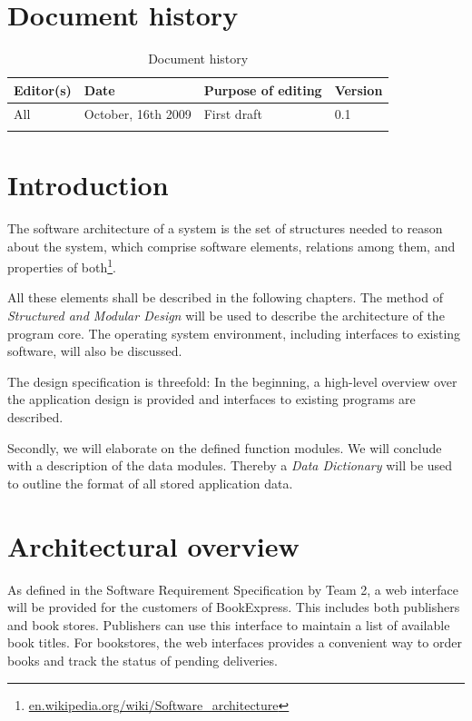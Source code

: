 


\maketitle
\newpage
\tableofcontents
\newpage
\listoftables
\newpage

\setcounter{page}{4}

\section{Document history}
\begin{longtable}[c]{|p{}|p{}|p{}|p{}|}
\hline
Editor(s) & Date & Purpose of editing & Version\\
\hline
\hline
All & October, 16th 2009 & First draft & 0.1 \\
\hline
\caption{Document history}
\end{longtable}
\newpage
\section{Introduction}
The software architecture of a system is the set of structures needed to reason about the system, which comprise software elements, relations among them, and properties of both\footnote{\href{en.wikipedia.org/wiki/Software_architecture}{en.wikipedia.org/wiki/Software\_architecture}}.

All these elements shall be described in the following chapters. The method of \emph{Structured and Modular Design} will be used to describe the architecture of the program core. The operating system environment, including interfaces to existing software, will also be discussed.

The design specification is threefold: In the beginning, a high-level overview over the application design is provided and interfaces to existing programs are described.

Secondly, we will elaborate on the defined function modules. We will conclude with a description of the data modules. Thereby a \emph{Data Dictionary} will be used to outline the format of all stored application data.
\newpage
\section{Architectural overview}
As defined in the Software Requirement Specification by Team 2, a web interface will be provided for the customers of BookExpress. This includes both publishers and book stores. Publishers can use this interface to maintain a list of available book titles. For bookstores, the web interfaces provides a convenient way to order books and track the status of pending deliveries.

